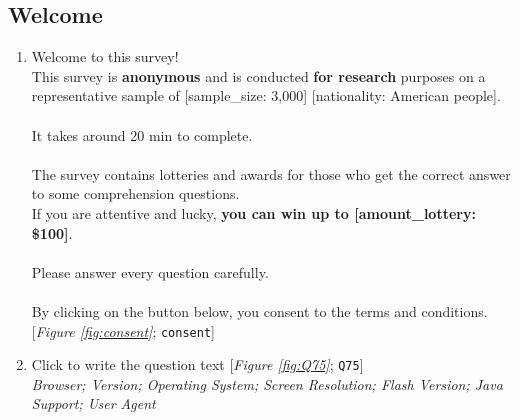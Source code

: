 \subsection*{Welcome} 
 \begin{enumerate} 
\item  \label{q:consent} Welcome to this survey!\\
This survey is \textbf{anonymous }and is conducted \textbf{for research} purposes on a representative sample of [sample\_size: 3,000] [nationality: American people].\\
\\
It takes around 20 min to complete.\\
\\
The survey contains lotteries and awards for those who get the correct answer to some comprehension questions.\\
If you are attentive and lucky, \textbf{you can win up to [amount\_lottery: \$100]}.\\
\\
Please answer every question carefully.\\
\\
By clicking on the button below, you consent to the terms and conditions. [\textit{Figure \ref{fig:consent}}; 
\verb|consent|]


\item  \label{q:Q75} Click to write the question text [\textit{Figure \ref{fig:Q75}}; 
\verb|Q75|]
  \\ \textit{Browser; Version; Operating System; Screen Resolution; Flash Version; Java Support; User Agent}

\end{enumerate} 

